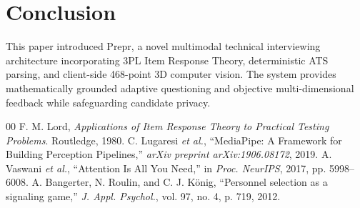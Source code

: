 \documentclass[journal,10pt,twocolumn]{IEEEtran}
\begin{document}
\section{Conclusion}
This paper introduced Prepr, a novel multimodal technical interviewing architecture incorporating 3PL Item Response Theory, deterministic ATS parsing, and client-side 468-point 3D computer vision. The system provides mathematically grounded adaptive questioning and objective multi-dimensional feedback while safeguarding candidate privacy.

\begin{thebibliography}{00}
 F. M. Lord, \emph{Applications of Item Response Theory to Practical Testing Problems}. Routledge, 1980.
 C. Lugaresi \emph{et al.}, ``MediaPipe: A Framework for Building Perception Pipelines,'' \emph{arXiv preprint arXiv:1906.08172}, 2019.
 A. Vaswani \emph{et al.}, ``Attention Is All You Need,'' in \emph{Proc. NeurIPS}, 2017, pp. 5998--6008.
 A. Bangerter, N. Roulin, and C. J. K{\"o}nig, ``Personnel selection as a signaling game,'' \emph{J. Appl. Psychol.}, vol. 97, no. 4, p. 719, 2012.
\end{thebibliography}
\end{document}
